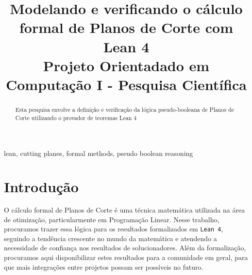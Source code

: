\documentclass[conference]{IEEEtran}
\begin{document}
\title{Modelando e verificando o cálculo formal de Planos de Corte com Lean 4\\
{\footnotesize Projeto Orientadado em Computação I - Pesquisa Científica}
}

\author{
}

\maketitle

\begin{abstract}
    Esta pesquisa envolve a definição e verificação da lógica pseudo-booleana de
    Planos de Corte utilizando o provador de teoremas Lean 4

\end{abstract}

\begin{IEEEkeywords}
    lean, cutting planes, formal methods, pseudo boolean reasoning
\end{IEEEkeywords}

\section{Introdução}

O cálculo formal de Planos de Corte é uma técnica matemática utilizada na área de otimização,
particularmente em Programação Linear.
Nesse trabalho, procuramos trazer essa lógica para os resultados formalizados em \texttt{Lean 4},
seguindo a tendência crescente no mundo da matemática e atendendo a necessidade de confiança
nos resultados de solucionadores. Além da formalização, procuramos aqui disponibilizar estes
resultados para a comunidade em geral, para que mais integrações entre projetos possam ser possíveis
no futuro.
\end{document}
